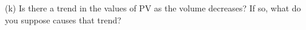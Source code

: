 \vspace{12cm}

(k) Is there a trend in the values of PV as the volume decreases? If so, 
what do you suppose causes that trend?







